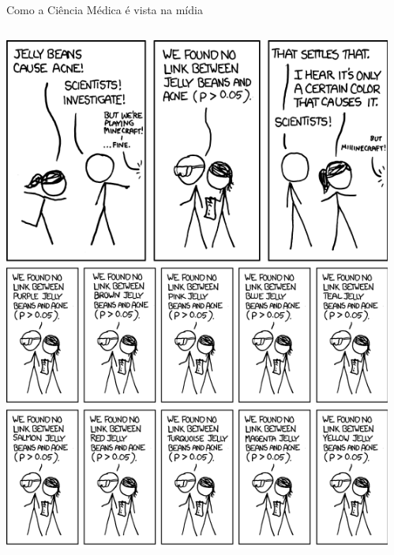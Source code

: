 \documentclass{beamer}
\begin{document}
\begin{frame}{\scriptsize Como a Ciência Médica é vista na mídia}
  \begin{columns}
    \begin{column}{5cm}
      \begin{center}
        \includegraphics[height=.8\textheight]{Cap10-11/xkcd-significant1}
      \end{center}
    \end{column}
    \begin{column}{5cm}
      \begin{center}

\end{center}
\end{column}
\end{columns}
\end{frame}
\end{document}
